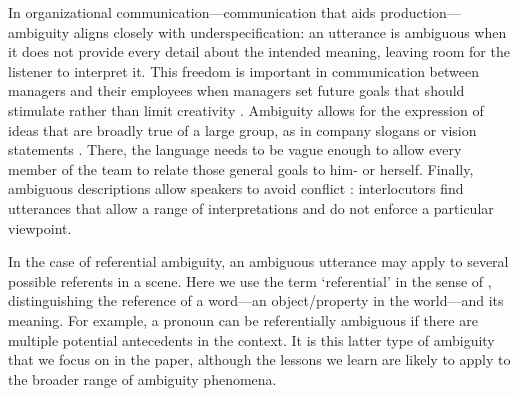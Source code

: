 \documentclass[11pt,a4paper]{article}
\newcommand{\gcs}[1]{\textcolor{blue}{[gcs: #1]}}
\begin{document}
In organizational communication---communication that aids production---ambiguity aligns closely with underspecification: an utterance is ambiguous when it does not provide every detail about the intended meaning, leaving room for the listener to interpret it. This freedom is important in communication between managers and their employees when managers set future goals that should stimulate rather than limit creativity \cite{mohr1983implications}. Ambiguity allows for the expression of ideas that are broadly true of a large group, as in company slogans or vision statements \cite{carmon2013}. There, the language needs to be vague enough to allow every member of the team to relate those general goals to him- or herself. Finally, ambiguous descriptions allow speakers to avoid conflict \cite{pascale1981art}: interlocutors find utterances that allow a range of interpretations and do not enforce a particular viewpoint. 

In the case of referential ambiguity, an ambiguous utterance may apply to several possible referents in a scene. Here we use the term `referential' in the sense of , distinguishing the reference of a word---an object/property in the world---and its meaning. For example, a pronoun can be referentially ambiguous if there are multiple potential antecedents in the context. 
It is this latter type of ambiguity that we focus on in the paper, although the lessons we learn are likely to apply to the broader range of ambiguity phenomena.


\end{document}
